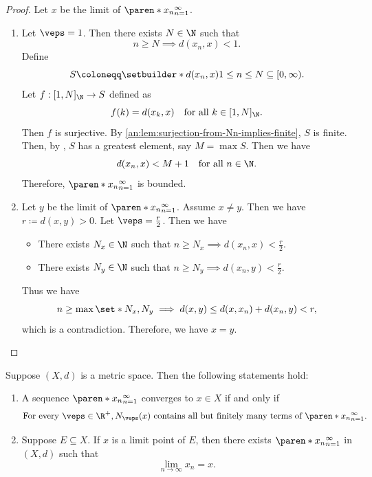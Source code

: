 \begin{proof}
  Let $x$ be the limit of $\paren*{x_{n}}_{n = 1}^{\infty}$.
  \begin{enumerate}[label=\textbf{(\Alph*)}]
    \item Let $\veps = 1$. Then there exists $N \in \N$ such that
          \[
            n \geq N \implies d(x_{n}, x) < 1.
          \]
          Define
          \[
            S \coloneqq \setbuilder*{d(x_{n}, x)}{1 \leq n \leq N} \subseteq [0, \infty).
          \]
          Let $f: [1, N]_{\N} \to S$ defined as
          \[
            f(k) = d(x_{k}, x) \quad \text{for all } k \in [1, N]_{\N}.
          \]
          Then $f$ is surjective. By \cref{an:lem:surjection-from-Nn-implies-finite}, $S$ is finite. Then, by
          , $S$ has a greatest element, say $M = \max S$. Then we have
          \[
            d(x_{n}, x) < M + 1 \quad \text{for all } n \in \N.
          \]
          Therefore, $\paren*{x_{n}}_{n = 1}^{\infty}$ is bounded.
    \item Let $y$ be the limit of $\paren*{x_{n}}_{n = 1}^{\infty}$. Assume $x \neq y$.
          Then we have $r \coloneqq d(x, y) > 0$. Let $\veps = \frac{r}{2}$. Then we have
          \begin{itemize}
            \item There exists $N_{x} \in \N$ such that $n \geq N_{x} \implies d(x_{n}, x) < \frac{r}{2}$.
            \item There exists $N_{y} \in \N$ such that $n \geq N_{y} \implies d(x_{n}, y) < \frac{r}{2}$.
          \end{itemize}
          Thus we have
          \[
            n \geq \max\set*{N_{x}, N_{y}} \implies d(x, y) \leq d(x, x_{n}) + d(x_{n}, y) < r,
          \]
          which is a contradiction. Therefore, we have $x = y$.
  \end{enumerate}
\end{proof}

\bigskip

\begin{theorem} \label{an:thm:neighborhood}
  Suppose $(X, d)$ is a metric space. Then the following statements hold:
  \begin{enumerate}[label=\textbf{(\Alph*)}]
    \item A sequence $\paren*{x_{n}}_{n = 1}^{\infty}$ converges to $x \in X$ if and only if
          \[
            \text{For every } \veps \in \R^{+}, N_{\veps}(x) \text{ contains all but
              finitely many terms of } \paren*{x_{n}}_{n = 1}^{\infty}.
          \]
    \item Suppose $E \subseteq X$. If $x$ is a limit point of $E$, then there exists
          $\paren*{x_{n}}_{n = 1}^{\infty}$ in $(X, d)$ such that
          \[
            \lim_{n \to \infty} x_{n} = x.
          \]
  \end{enumerate}
\end{theorem}

